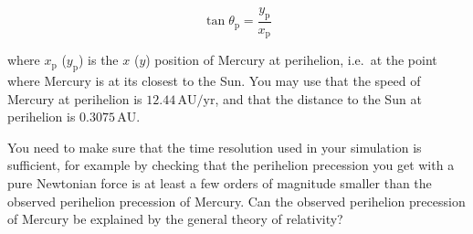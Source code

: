 \documentclass[%
oneside,                 %
final,                   %
10pt]{article}
\begin{document}
\[
\tan \theta_\mathrm{p} = \frac{y_\mathrm{p}}{x_\mathrm{p}}
\]

where $x_\mathrm{p}$ ($y_\mathrm{p}$) is the $x$ ($y$) position of
Mercury at perihelion, i.e.~at the point where Mercury is at its
closest to the Sun. You may use that the speed of Mercury at
perihelion is $12.44\,\mathrm{AU}/\mathrm{yr}$, and that the distance
to the Sun at perihelion is $0.3075\,\mathrm{AU}$.

You need to make
sure that the time resolution used in your simulation is sufficient,
for example by checking that the perihelion precession you get with a
pure Newtonian force is at least a few orders of magnitude smaller
than the observed perihelion precession of Mercury. Can the observed
perihelion precession of Mercury be explained by the general theory of
relativity?



\end{document}

